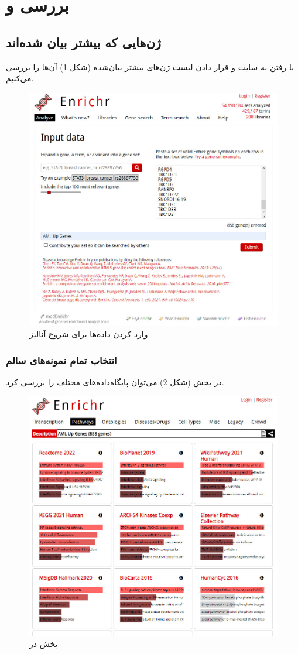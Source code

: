 \documentclass{article}
\begin{document}
\section{بررسی  و }
\subsection{ژن‌هایی که بیشتر بیان شده‌اند}
با رفتن به سایت \href{https://maayanlab.cloud/Enrichr/}{} و قرار دادن لیست ژن‌های بیشتر بیان‌شده (شکل \ref{fig:enrichr}) آن‌‌ها را بررسی می‌کنیم.
\begin{figure}[h!]
	\centering
	\includegraphics[width=0.5\columnwidth]{figs/enrichr.jpg}
	\caption{وارد کردن داده‌ها برای شروع آنالیز}
	\label{fig:enrichr}
\end{figure}

\subsubsection{انتخاب تمام نمونه‌های سالم}
در بخش  (شکل \ref{fig:enrichr-pathways}) می‌توان پایگاه‌داده‌های  مختلف را بررسی کرد.
\begin{figure}[h!]
	\centering
	\includegraphics[width=0.5\columnwidth]{figs/enrichr-pathways.jpg}
	\caption{بخش  در }
	\label{fig:enrichr-pathways}
\end{figure}
\end{document}
